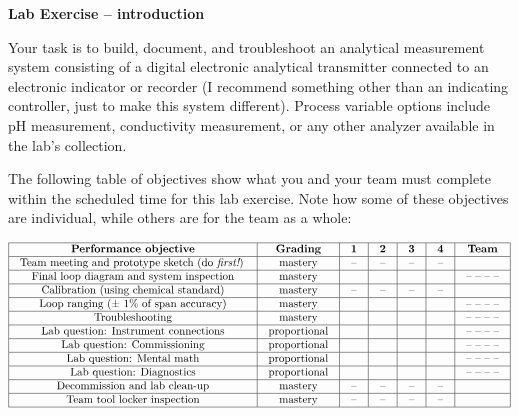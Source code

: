 

\noindent
{\bf Lab Exercise -- introduction}

\vskip 5pt

Your task is to build, document, and troubleshoot an analytical measurement system consisting of a digital electronic analytical transmitter connected to an electronic indicator or recorder (I recommend something other than an indicating controller, just to make this system different).  Process variable options include pH measurement, conductivity measurement, or any other analyzer available in the lab's collection.  

The following table of objectives show what you and your team must complete within the scheduled time for this lab exercise.  Note how some of these objectives are individual, while others are for the team as a whole:



$$\vbox{\offinterlineskip
\halign{\strut
\vrule \quad\hfil # \ \hfil & 
\vrule \quad\hfil # \ \hfil & 
\vrule \quad\hfil # \ \hfil & 
\vrule \quad\hfil # \ \hfil & 
\vrule \quad\hfil # \ \hfil & 
\vrule \quad\hfil # \ \hfil & 
\vrule \quad\hfil # \ \hfil \vrule \cr
\noalign{\hrule}
%
{\bf Performance objective} & {\bf Grading} & {\bf 1} & {\bf 2} & {\bf 3} & {\bf 4} & {\bf Team} \cr
%
\noalign{\hrule}
%
Team meeting and prototype sketch (do {\it first!}) & mastery & -- & -- & -- & -- & \cr
%
\noalign{\hrule}
%
Final loop diagram and system inspection & mastery & & & & & -- -- -- -- \cr
%
\noalign{\hrule}
%
Calibration (using chemical standard) & mastery & -- & -- & -- & -- &  \cr
%
\noalign{\hrule}
%
Loop ranging ($\pm$ 1\% of span accuracy) & mastery & & & & & -- -- -- -- \cr
%
\noalign{\hrule}
%
Troubleshooting & mastery & & & & & -- -- -- -- \cr
%
\noalign{\hrule}
%
Lab question: Instrument connections & proportional &  &  &  &  & -- -- -- -- \cr
%
\noalign{\hrule}
%
Lab question: Commissioning & proportional &  &  &  &  & -- -- -- -- \cr
%
\noalign{\hrule}
%
Lab question: Mental math & proportional &  &  &  &  & -- -- -- -- \cr
%
\noalign{\hrule}
%
Lab question: Diagnostics & proportional &  &  &  &  & -- -- -- -- \cr
%
\noalign{\hrule}
%
Decommission and lab clean-up & mastery & -- & -- & -- & -- &  \cr
%
\noalign{\hrule}
%
Team tool locker inspection & mastery & -- & -- & -- & -- &  \cr
%
\noalign{\hrule}
} %
}$$ %

